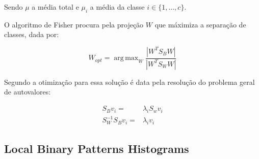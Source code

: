 Sendo $\mu$ a média total e $\mu_i$ a média da classe $i \in \{1,\ldots,c\}$.

O algoritmo de Fisher procura pela projeção $W$ que máximiza a separação de classes, dada por:

\begin{equation*}
W_{opt} = \operatorname{arg\,max}_{W} \frac{|W^T S_B W|}{|W^T S_W W|}
\end{equation*}

Segundo \cite{fisherfaces} a otimização para essa solução é data pela resolução do problema geral de autovalores:



\begin{align*} 
    S_{B} v_{i} = & \lambda_{i} S_w v_{i} \nonumber \\ 
    S_{W}^{-1} S_{B} v_{i} = & \lambda_{i} v_{i} 
\end{align*}


\subsection*{Local Binary Patterns Histograms} %
\label{sub:local_binary_patterns_histograms}

